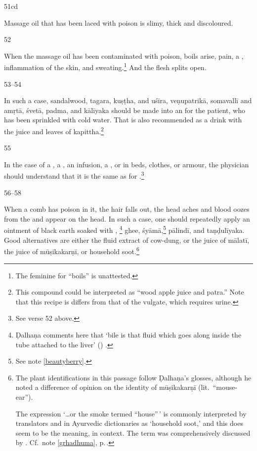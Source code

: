 \begin{translation}
\item[51cd]

Massage oil that has been laced with poison is slimy, thick and discoloured.   

\item[52]

When the massage oil has been contaminated with poison, boils arise,
pain, a , inflammation of the skin, and
sweating.\footnote{The feminine  for “boils” is unattested.}
    And the flesh splits open.

\item[53--54]

In such a case, sandalwood, \gls{tagara}, \gls{kuṣṭha}, and 
\gls{uśīra}, 
\gls{veṇupatrikā}, 
\gls{somavallī}
and 
\gls{amṛtā}, 
\gls{śvetā}, 
\gls{padma}, and 
\gls{kālīyaka} should be made into an
 for the patient, who has been sprinkled with cold 
water.
That is also recommended as a drink with the juice and leaves of
\gls{kapittha}.\footnote{This compound could be interpreted as 
“wood
apple juice and \gls{patra}.”  Note that this recipe is differs
from that of the vulgate, which requires urine.}
 
 \item[55]
 
In the case of a , a , an infusion, a
, or in beds, clothes, or armour, the physician 
should understand that it is the same as for 
.\footnote{See verse 52 above.}
 
 \item[56--58]
 
 When a comb has poison in it, the hair falls out, the head aches and blood
oozes from the  and  appear on the
head. In such a case, one should repeatedly apply an ointment of black earth
soaked with ,
\label{fluidbile}\footnote{Ḍalhaṇa comments here that `bile is that fluid
    which goes along inside the tube attached to the liver'
    ()
    .} ghee, \gls{śyāmā},\footnote{See note \ref{beautyberry}.}
        \gls{pālindī},
        and \gls{taṇḍulīyaka}.
        Good alternatives are either the fluid extract of cow-dung, or the juice of
        \gls{mālatī}, 
        the juice of \gls{mūṣikakarṇī},
        or household soot.\footnote{The plant identifications in this passage follow
            Ḍalhaṇa's glosses, although he noted a difference of opinion on the identity
            of \gls{mūṣikakarṇī} (lit.\ “mouse-ear”). \par The expression  `\ldots or the smoke termed ``house''\,' is commonly
            interpreted by translators and in Ayurvedic dictionaries as `household soot,'
            and this does seem to be the meaning, in context.  The term was
            comprehensively discussed by \citet[443]{meul-2008}. Cf.\ note
            \ref{grhadhuma}, p.\,\pageref{grhadhuma}.\label{soot}}
 

\end{translation}

